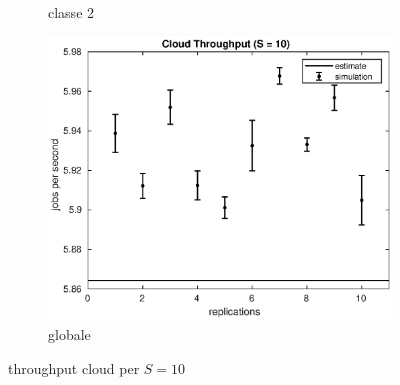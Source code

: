 \begin{figure}[!h]
\begin{subfigure}[t]{0.49\textwidth}
\caption{classe 2}
\label{10_x2cloud}
\end{subfigure}
%
\begin{subfigure}[t]{0.5\textwidth}
\includegraphics[width=\textwidth]{figures/simul/10_500K_xcloud}
\caption{globale}
\label{10_xcloud}
\end{subfigure}
%
\caption{throughput cloud per $S = 10$}
\end{figure}
%

